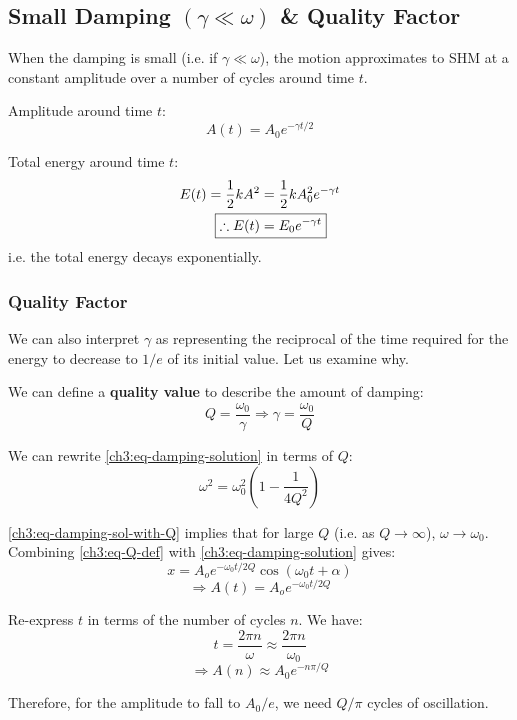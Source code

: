 \subsection{Small Damping $(\gamma \ll \omega)$ \& Quality Factor}

When the damping is small (i.e. if  $\gamma \ll \omega$), the motion approximates to SHM at a constant amplitude over a number of cycles around time $t$.

Amplitude around time $t$:
\[ A(t) = A_0 e^{-\gamma t/2} \]

Total energy around time $t$:
\begin{align*}
E(t) = \frac{1}{2}kA^2 
	&= \frac{1}{2}kA_0^2 e^{-\gamma t} \\
\Aboxed{\therefore E(t) &= E_0 e^{-\gamma t} }
\end{align*}
i.e. the total energy decays exponentially.

\subsubsection{Quality Factor} \label{ch3:sec-quality-factor}
We can also interpret $\gamma$ as representing the reciprocal of the time required for the energy to decrease to $1/e$ of its initial value. Let us examine why.

We can define a \textbf{quality value} to describe the amount of damping:
\begin{equation}
	\boxed{Q = \frac{\omega_0}{\gamma}} 
	\Longrightarrow 
	\gamma = \frac{\omega_0}{Q}
	\label{ch3:eq-Q-def}
\end{equation}

We can rewrite \eqref{ch3:eq-damping-solution} in terms of $Q$:
\begin{equation}
	\omega^2 = \omega_0^2 \left(1- \frac{1}{4Q^2}\right) \label{ch3:eq-damping-sol-with-Q}
\end{equation}

\eqref{ch3:eq-damping-sol-with-Q} implies that for large $Q$ (i.e. as $Q \to \infty$), $\omega \to \omega_0$. 
Combining \eqref{ch3:eq-Q-def} with \eqref{ch3:eq-damping-solution} gives:
\[ x = A_o e^{-\omega_0 t/2Q} \cos(\omega_0 t + \alpha) \]
\[ \Longrightarrow A(t) = A_o e^{-\omega_0 t/2Q} \]

Re-express $t$ in terms of the number of cycles $n$. We have:
\[ t = \frac{2\pi n}{\omega} \approx \frac{2\pi n}{\omega_0} \]
\[ \Longrightarrow A(n) \approx A_0 e^{-n\pi/Q} \]

Therefore, for the amplitude to fall to $A_0/e$, we need $Q/\pi$ cycles of oscillation.

